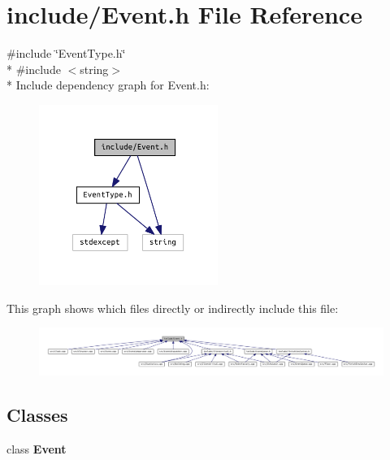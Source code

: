 \section{include/\+Event.h File Reference}
\label{_event_8h}
{\ttfamily \#include \char`\"{}Event\+Type.\+h\char`\"{}}\\*
{\ttfamily \#include $<$string$>$}\\*
Include dependency graph for Event.\+h\+:
\nopagebreak
\begin{figure}[H]
\begin{center}
\leavevmode
\includegraphics[width=165pt]{_event_8h__incl}
\end{center}
\end{figure}
This graph shows which files directly or indirectly include this file\+:
\nopagebreak
\begin{figure}[H]
\begin{center}
\leavevmode
\includegraphics[width=350pt]{_event_8h__dep__incl}
\end{center}
\end{figure}
\subsection*{Classes}
\begin{DoxyCompactItemize}
\item 
class {\bf Event}
\end{DoxyCompactItemize}
